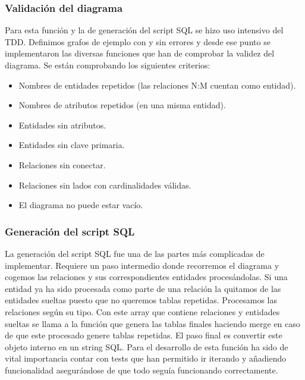 \subsubsection{Validación del diagrama}
Para esta función y la de generación del script SQL se hizo uso intensivo del TDD.
Definimos grafos de ejemplo con y sin errores y desde ese punto se implementaron las diversas funciones que han de comprobar la validez del diagrama.
Se están comprobando los siguientes criterios:
\begin{itemize}
\tightlist
    \item Nombres de entidades repetidos (las relaciones N:M cuentan como entidad).
    \item Nombres de atributos repetidos (en una misma entidad).
    \item Entidades sin atributos.
    \item Entidades sin clave primaria.
    \item Relaciones sin conectar.
    \item Relaciones sin lados con cardinalidades válidas.
    \item El diagrama no puede estar vacío.
\end{itemize}

\subsubsection{Generación del script SQL}
La generación del script SQL fue una de las partes más complicadas de implementar. Requiere un paso intermedio donde recorremos el diagrama y cogemos las relaciones y sus correspondientes entidades procesándolas.
Si una entidad ya ha sido procesada como parte de una relación la quitamos de las entidades sueltas puesto que no queremos tablas repetidas.
Procesamos las relaciones según su tipo.
Con este array que contiene relaciones y entidades sueltas se llama a la función que genera las tablas finales haciendo merge en caso de que  este procesado genere tablas repetidas.
El paso final es convertir este objeto interno en un string SQL.
Para el desarrollo de esta función ha sido de vital importancia contar con tests que han permitido ir iterando y añadiendo funcionalidad asegurándose de que todo seguía funcionando correctamente.
